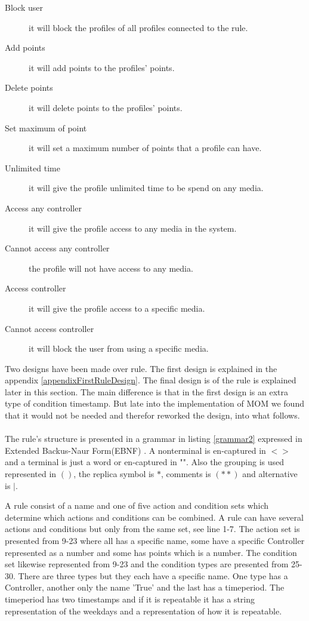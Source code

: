 \begin{description}
	\item[Block user] it will block the profiles of all profiles connected to the rule. 
	\item[Add points] it will add points to the profiles' points.
	\item[Delete points]  it will delete points to the profiles' points.  
	\item[Set maximum of point] it will set a maximum number of points that a profile can have. 
	\item[Unlimited time] it will give the profile unlimited time to be spend on any media. 
	\item[Access any controller] it will give the profile access to any media in the system. 
	\item[Cannot access any controller] the profile will not have access to any media. 
	\item[Access controller] it will give the profile access to a specific media. 
	\item[Cannot access controller] it will block the user from using a specific media. 
\end{description}
Two designs have been made over rule. The first design is explained in the appendix \vref{appendixFirstRuleDesign}. The final design is of the rule is explained later in this section. The main difference is that in the first design is an extra type of condition timestamp. But late into the implementation of MOM we found that it would not be needed and therefor reworked the design, into what follows.\\
\\
The rule's structure is presented in a grammar in listing	\ref{grammar2} expressed in Extended Backus-Naur Form(EBNF) \citep{CoPL}.
A nonterminal is en-captured in $<>$ and a terminal is just a word or en-captured in "". 
Also the grouping is used represented in $()$, the replica symbol is $*$, comments is $(**)$ and alternative is $|$. 

A rule consist of a name and one of five action and condition sets which determine which actions and conditions can be combined. A rule can have several actions and conditions but only from the same set, see line 1-7. The action set is presented from 9-23 where all has a specific name, some have a specific Controller represented as a number and some has points which is a number. The condition set likewise represented from 9-23 and the condition types are presented from 25-30. There are three types but they each have a specific name. One type has a Controller, another only the name 'True' and the last has a timeperiod. The timeperiod has two timestamps and if it is repeatable it has a string representation of the weekdays and a representation of how it is repeatable. 

